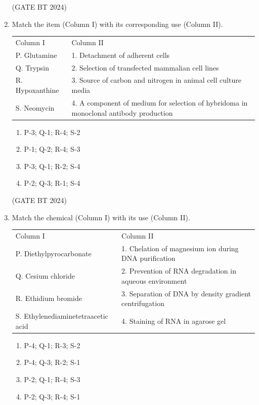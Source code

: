 \documentclass[journal,12pt,onecolumn]{IEEEtran}
\theoremstyle{remark}
\begin{document}
\begin{enumerate}
\hfill (GATE BT 2024)

\item Match the item (Column I) with its corresponding use (Column II).

\begin{tabular}{ll}
Column I & Column II \\
P. Glutamine & 1. Detachment of adherent cells \\
Q. Trypsin & 2. Selection of transfected mammalian cell lines \\
R. Hypoxanthine & 3. Source of carbon and nitrogen in animal cell culture media \\
S. Neomycin & 4. A component of medium for selection of hybridoma in monoclonal antibody production \\
\end{tabular}

\begin{enumerate}
\item P-3; Q-1; R-4; S-2 \hfill
\item P-1; Q-2; R-4; S-3 \hfill
\item P-3; Q-1; R-2; S-4 \hfill
\item P-2; Q-3; R-1; S-4
\end{enumerate}

\hfill (GATE BT 2024)

\item Match the chemical (Column I) with its use (Column II).

\begin{tabular}{ll}
Column I & Column II \\
P. Diethylpyrocarbonate & 1. Chelation of magnesium ion during DNA purification \\
Q. Cesium chloride & 2. Prevention of RNA degradation in aqueous environment \\
R. Ethidium bromide & 3. Separation of DNA by density gradient centrifugation \\
S. Ethylenediaminetetraacetic acid & 4. Staining of RNA in agarose gel \\
\end{tabular}

\begin{enumerate}
\item P-4; Q-1; R-3; S-2 \hfill
\item P-4; Q-3; R-2; S-1 \hfill
\item P-2; Q-1; R-4; S-3 \hfill
\item P-2; Q-3; R-4; S-1
\end{enumerate}


\end{enumerate}
\end{document}
